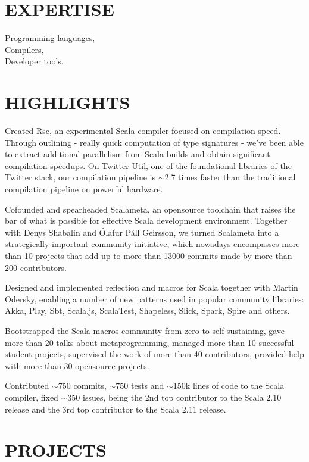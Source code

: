 \documentclass[margin, 10pt]{Stylesheet}
\begin{document}
\begin{resume}

\section{EXPERTISE}

Programming languages,\\
Compilers,\\
Developer tools.

\section{HIGHLIGHTS}

Created Rsc, an experimental Scala compiler focused on compilation speed. Through outlining - really
quick computation of type signatures - we've been able to extract additional parallelism from Scala
builds and obtain significant compilation speedups. On Twitter Util, one of the foundational
libraries of the Twitter stack, our compilation pipeline is $\sim$2.7 times faster than the
traditional compilation pipeline on powerful hardware.

Cofounded and spearheaded Scalameta, an opensource toolchain that raises the bar of what is possible
for effective Scala development environment. Together with Denys Shabalin and \'{O}lafur P\'{a}ll
Geirsson, we turned Scalameta into a strategically important community initiative, which nowadays
encompasses more than 10 projects that add up to more than 13000 commits made by more than 200
contributors.

Designed and implemented reflection and macros for Scala together with Martin Odersky,
enabling a number of new patterns used in popular community libraries:
Akka, Play, Sbt, Scala.js, ScalaTest, Shapeless, Slick, Spark, Spire and others.

Bootstrapped the Scala macros community from zero to self-sustaining, gave more than 20 talks about
metaprogramming, managed more than 10 successful student projects, supervised the work of more than
40 contributors, provided help with more than 30 opensource projects.

Contributed $\sim$750 commits, $\sim$750 tests and $\sim$150k lines of code to the Scala compiler,
fixed $\sim$350 issues, being the 2nd top contributor to the Scala 2.10 release
and the 3rd top contributor to the Scala 2.11 release.

\section{PROJECTS}


\end{resume}
\end{document}

